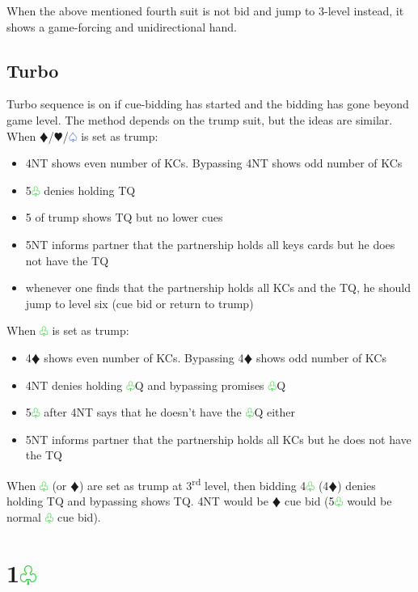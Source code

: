 \documentclass{article}
\renewcommand{\sp}{\textcolor{RoyalBlue}{$\varspade$}}
\newcommand{\he}{\textcolor{RubineRed}{$\varheart$}}
\newcommand{\di}{\textcolor{Peach}{$\vardiamond$}}
\newcommand{\cl}{\textcolor{LimeGreen}{$\varclub$}}
\newcommand{\nt}{\relsize{-1}NT\relsize{1}}
\begin{document}
When the above mentioned fourth suit is not bid and jump to 3-level instead, it shows a game-forcing and unidirectional hand.

\subsection{Turbo}
Turbo sequence is on if cue-bidding has started and the bidding has gone beyond game level. The method depends on the trump suit, but the ideas are similar. \\

When \di{}/\he/\sp{} is set as trump:
\begin{itemize}
	\itemsep0em
	\item 4\nt{} shows even number of KCs. Bypassing 4\nt{} shows odd number of KCs
	\item 5\cl{} denies holding TQ
	\item 5 of trump shows TQ but no lower cues
	\item 5\nt{} informs partner that the partnership holds all keys cards but he does not have the TQ
	\item whenever one finds that the partnership holds all KCs and the TQ, he should jump to level six (cue bid or return to trump)
\end{itemize}

When \cl{} is set as trump:
\begin{itemize}
	\itemsep0em
	\item 4\di{} shows even number of KCs. Bypassing 4\di{} shows odd number of KCs
	\item 4\nt{} denies holding \cl{}Q and bypassing promises \cl{}Q
	\item 5\cl{} after 4\nt{} says that he doesn't have the \cl{}Q either
	\item 5\nt{} informs partner that the partnership holds all KCs but he does not have the TQ
\end{itemize}

When \cl{} (or \di{}) are set as trump at 3\textsuperscript{rd} level, then bidding 4\cl{} (4\di{}) denies holding TQ and bypassing shows TQ. 4\nt{} would be \di{} cue bid (5\cl{} would be normal \cl{} cue bid).

\section{1\cl{}}
\end{document}

